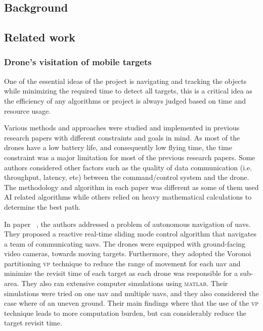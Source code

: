 \documentclass[../main.tex]{subfiles}
\begin{document}
\subsection{Background}

\blindtext

\subsection{Related work}

	\subsubsection{Drone's visitation of mobile targets}

		One of the essential ideas of the project is navigating 
		and tracking the objects while minimizing the required 
		time to detect all targets,
		this is a critical idea as the efficiency of any algorithms 
		or project is always judged based on time and resource usage.
		
		Various methods and approaches were studied and implemented 
		in previous research papers with different constraints and 
		goals in mind.
		As most of the drones have a low battery life, 
		and consequently low flying time, the time constraint was a major limitation 
		for most of the previous research papers. 
		Some authors considered other factors such as the quality 
		of data communication (i.e. throughput, latency, etc) between the command/control 
		system and the drone.
		The methodology and algorithm in each paper was different 
		as some of them used AI related algorithms while others relied 
		on heavy mathematical calculations to determine the best path.
		
		In paper ~\cite{hua20}, the authors \citeauthor{hua20} 
		addressed a problem of autonomous navigation of \glspl{uav}. 
		They proposed a reactive real-time sliding mode control algorithm 
		that navigates a team of communicating \glspl{uav}.
		The drones were equipped with ground-facing video cameras,
		towards moving targets. 
		Furthermore, they adopted the Voronoi partitioning \textsc{vp} technique 
		to reduce the range of movement for each \gls{uav} and 
		minimize the revisit time of each target as each drone was responsible 
		for a sub-area.
		They also ran extensive computer simulations using \textsc{matlab}. 
		Their simulations were tried on one \gls{uav} and multiple \glspl{uav},
		and they also considered the case where of an uneven ground. 
		Their main findings where that the use of the \textsc{vp} technique 
		leads to more computation burden, but can considerably reduce the target 
		revisit time.
		
\end{document}
